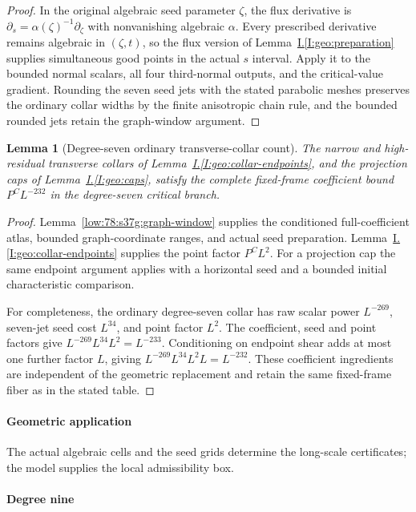 \documentclass[11pt]{amsart}
\newtheorem{lemma}[theorem]{Lemma}
\theoremstyle{definition}
\theoremstyle{remark}
\numberwithin{equation}{section}
\newcommand{\partIref}[1]{\hyperref[I:#1]{I.\ref*{I:#1}}}
\begin{document}
\begin{proof}
In the original algebraic seed parameter $\zeta$, the flux derivative is $\partial_s=\alpha(\zeta)^{-1}\partial_\zeta$ with nonvanishing algebraic $\alpha$. Every prescribed derivative remains algebraic in $(\zeta,t)$, so the flux version of Lemma~\partIref{geo:preparation} supplies simultaneous good points in the actual $s$ interval. Apply it to the bounded normal scalars, all four third-normal outputs, and the critical-value gradient. Rounding the seven seed jets with the stated parabolic meshes preserves the ordinary collar widths by the finite anisotropic chain rule, and the bounded rounded jets retain the graph-window argument.
\end{proof}

\begin{lemma}[Degree-seven ordinary transverse-collar count]\label{low:78:s37g:high}
The narrow and high-residual transverse collars of Lemma~\partIref{geo:collar-endpoints}, and the projection caps of Lemma~\partIref{geo:caps}, satisfy the complete fixed-frame coefficient bound $P^CL^{-232}$ in the degree-seven critical branch.
\end{lemma}
\begin{proof}
Lemma~\ref{low:78:s37g:graph-window} supplies the conditioned full-coefficient atlas, bounded graph-coordinate ranges, and actual seed preparation. Lemma~\partIref{geo:collar-endpoints} supplies the point factor $P^CL^2$. For a projection cap the same endpoint argument applies with a horizontal seed and a bounded initial characteristic comparison. 

For completeness, the ordinary degree-seven collar has raw scalar power $L^{-269}$, seven-jet seed cost $L^{34}$, and point factor $L^2$. The coefficient, seed and point factors give $L^{-269}L^{34}L^2=L^{-233}$. Conditioning on endpoint shear adds at most one further factor $L$, giving $L^{-269}L^{34}L^2L=L^{-232}$. These coefficient ingredients are independent of the geometric replacement and retain the same fixed-frame fiber as in the stated table.
\end{proof}

\paragraph{Geometric application}

The actual algebraic cells and the seed grids determine the long-scale certificates; the model supplies the local admissibility box.

\paragraph{Degree nine}
\end{document}
